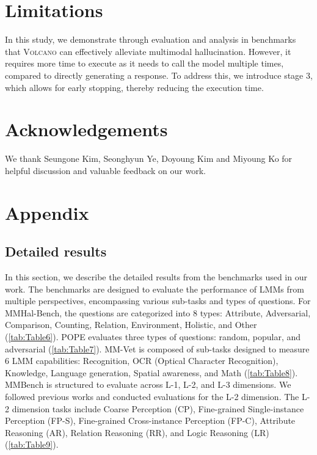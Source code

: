 \documentclass[11pt]{article}
\newcommand{\Ours}{\textsc{Volcano}}
\begin{document}
\section*{Limitations}
\label{sec:limit}
In this study, we demonstrate through evaluation and analysis in benchmarks that {\Ours} can effectively alleviate multimodal hallucination. However, it requires more time to execute as it needs to call the model multiple times, compared to directly generating a response. To address this, we introduce stage 3, which allows for early stopping, thereby reducing the execution time.
\section*{Acknowledgements}
\label{sect:ack}
We thank Seungone Kim, Seonghyun Ye, Doyoung Kim and Miyoung Ko for helpful discussion and valuable feedback on our work.


\appendix
\section{Appendix}
\label{sec:appendix}
\subsection{Detailed results}
In this section, we describe the detailed results from the benchmarks used in our work. The benchmarks are designed to evaluate the performance of LMMs from multiple perspectives, encompassing various sub-tasks and types of questions. For MMHal-Bench, the questions are categorized into 8 types: Attribute, Adversarial, Comparison, Counting, Relation, Environment, Holistic, and Other (\autoref{tab:Table6}). POPE evaluates three types of questions: random, popular, and adversarial (\autoref{tab:Table7}). MM-Vet is composed of sub-tasks designed to measure 6 LMM capabilities: Recognition, OCR (Optical Character Recognition), Knowledge, Language generation, Spatial awareness, and Math (\autoref{tab:Table8}). MMBench is structured to evaluate across L-1, L-2, and L-3 dimensions. We followed previous works and conducted evaluations for the L-2 dimension. The L-2 dimension tasks include Coarse Perception (CP), Fine-grained Single-instance Perception (FP-S), Fine-grained Cross-instance Perception (FP-C), Attribute Reasoning (AR), Relation Reasoning (RR), and Logic Reasoning (LR) (\autoref{tab:Table9}).
\end{document}
